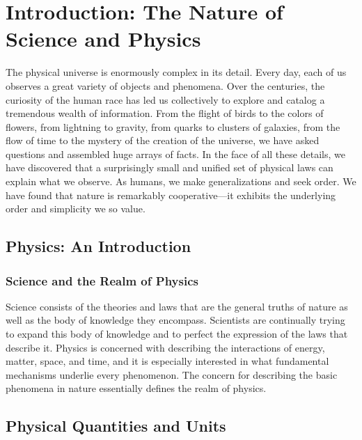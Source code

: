 \documentclass[main-ap-physics.tex]{subfiles}
\begin{document}
\section{Introduction: The Nature of Science and Physics}

The physical universe is enormously complex in its detail. Every day, each of us observes a great variety of objects and phenomena. Over the centuries, the curiosity of the human race has led us collectively to explore and catalog a tremendous wealth of information. From the flight of birds to the colors of flowers, from lightning to gravity, from quarks to clusters of galaxies, from the flow of time to the mystery of the creation of the universe, we have asked questions and assembled huge arrays of facts. In the face of all these details, we have discovered that a surprisingly small and unified set of physical laws can explain what we observe. As humans, we make generalizations and seek order. We have found that nature is remarkably cooperative---it exhibits the underlying order and simplicity we so value.

\subsection{Physics: An Introduction}

\subsubsection*{Science and the Realm of Physics}

Science consists of the theories and laws that are the general truths of nature as well as the body of knowledge they encompass. Scientists are continually trying to expand this body of knowledge and to perfect the expression of the laws that describe it. Physics is concerned with describing the interactions of energy, matter, space, and time, and it is especially interested in what fundamental mechanisms underlie every phenomenon. The concern for describing the basic phenomena in nature essentially defines the realm of physics.

\subsection{Physical Quantities and Units}
\end{document}
